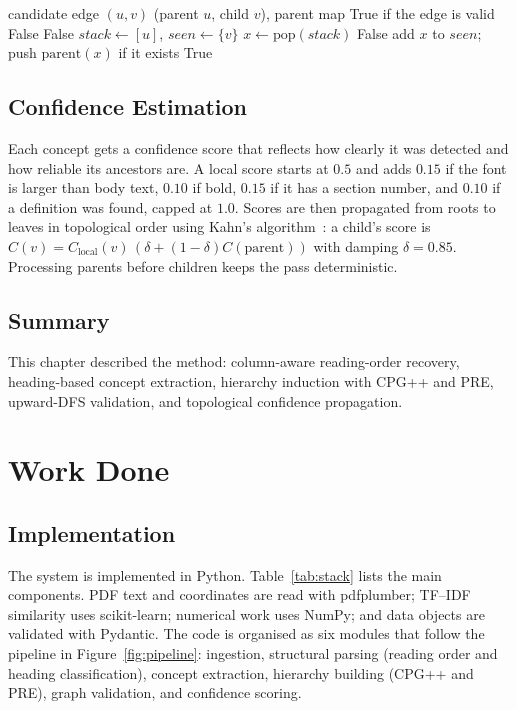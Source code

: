 \documentclass[12pt,a4paper,twoside,openright]{report}
\begin{document}
\begin{algorithm}[!htbp]
\caption{Upward DFS Cycle and Depth Check}
\label{alg:dfs}
\begin{algorithmic}[1]
\REQUIRE candidate edge $(u,v)$ (parent $u$, child $v$), parent map
\ENSURE True if the edge is valid
 \RETURN False \ENDIF
{} \RETURN False \ENDIF
\STATE $stack \leftarrow [u]$, $seen \leftarrow \{v\}$
  \STATE $x \leftarrow \text{pop}(stack)$
   \RETURN False  \ENDIF
   \STATE add $x$ to $seen$; push $\text{parent}(x)$ if it exists \ENDIF
\ENDWHILE
\RETURN True
\end{algorithmic}
\end{algorithm}

\section{Confidence Estimation}
Each concept gets a confidence score that reflects how clearly it was detected and how
reliable its ancestors are. A local score starts at $0.5$ and adds $0.15$ if the font is
larger than body text, $0.10$ if bold, $0.15$ if it has a section number, and $0.10$ if
a definition was found, capped at $1.0$. Scores are then propagated from roots to leaves
in topological order using Kahn's algorithm~\cite{kahn1962topological}: a child's score
is $C(v)=C_{\text{local}}(v)\,(\delta+(1-\delta)C(\text{parent}))$ with damping
$\delta=0.85$. Processing parents before children keeps the pass deterministic.

\section{Summary}
This chapter described the method: column-aware reading-order recovery, heading-based
concept extraction, hierarchy induction with CPG++ and PRE, upward-DFS validation, and
topological confidence propagation.

\chapter{Work Done}

\section{Implementation}
The system is implemented in Python. Table~\ref{tab:stack} lists the main components.
PDF text and coordinates are read with pdfplumber; TF--IDF similarity uses
scikit-learn; numerical work uses NumPy; and data objects are validated with Pydantic.
The code is organised as six modules that follow the pipeline in Figure~\ref{fig:pipeline}:
ingestion, structural parsing (reading order and heading classification), concept
extraction, hierarchy building (CPG++ and PRE), graph validation, and confidence
scoring.
\end{document}

